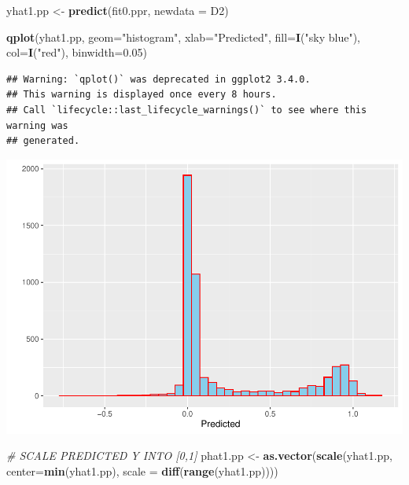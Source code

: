 \documentclass[
  11pt,
]{article}
\newenvironment{Shaded}{\begin{snugshade}}{\end{snugshade}}
\newcommand{\AttributeTok}[1]{\textcolor[rgb]{0.13,0.29,0.53}{#1}}
\newcommand{\CommentTok}[1]{\textcolor[rgb]{0.56,0.35,0.01}{\textit{#1}}}
\newcommand{\FloatTok}[1]{\textcolor[rgb]{0.00,0.00,0.81}{#1}}
\newcommand{\FunctionTok}[1]{\textcolor[rgb]{0.13,0.29,0.53}{\textbf{#1}}}
\newcommand{\NormalTok}[1]{#1}
\newcommand{\OtherTok}[1]{\textcolor[rgb]{0.56,0.35,0.01}{#1}}
\newcommand{\StringTok}[1]{\textcolor[rgb]{0.31,0.60,0.02}{#1}}
\begin{document}
\begin{Shaded}
\begin{Highlighting}[]
\NormalTok{yhat1.pp }\OtherTok{\textless{}{-}} \FunctionTok{predict}\NormalTok{(fit0.ppr, }\AttributeTok{newdata =}\NormalTok{ D2)}

\FunctionTok{qplot}\NormalTok{(yhat1.pp, }\AttributeTok{geom=}\StringTok{"histogram"}\NormalTok{, }\AttributeTok{xlab=}\StringTok{"Predicted"}\NormalTok{, }
      \AttributeTok{fill=}\FunctionTok{I}\NormalTok{(}\StringTok{"sky blue"}\NormalTok{), }\AttributeTok{col=}\FunctionTok{I}\NormalTok{(}\StringTok{"red"}\NormalTok{), }\AttributeTok{binwidth=}\FloatTok{0.05}\NormalTok{)}
\end{Highlighting}
\end{Shaded}

\begin{verbatim}
## Warning: `qplot()` was deprecated in ggplot2 3.4.0.
## This warning is displayed once every 8 hours.
## Call `lifecycle::last_lifecycle_warnings()` to see where this warning was
## generated.
\end{verbatim}

\includegraphics[width=0.9\linewidth]{OWUSU_project_files/figure-latex/unnamed-chunk-46-1}

\begin{Shaded}
\begin{Highlighting}[]
\CommentTok{\# SCALE PREDICTED Y INTO [0,1]}
\NormalTok{phat1.pp }\OtherTok{\textless{}{-}} \FunctionTok{as.vector}\NormalTok{(}\FunctionTok{scale}\NormalTok{(yhat1.pp, }\AttributeTok{center=}\FunctionTok{min}\NormalTok{(yhat1.pp), }
                   \AttributeTok{scale =} \FunctionTok{diff}\NormalTok{(}\FunctionTok{range}\NormalTok{(yhat1.pp))))}
\end{Highlighting}
\end{Shaded}
\end{document}

